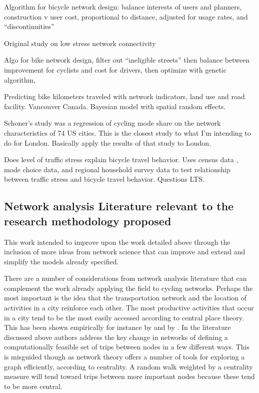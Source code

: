 \documentclass[11pt]{article} %
\begin{document}
Algorithm for bicycle network design: balance interests of users and planners, construction v user cost, proportional to distance, adjusted for usage rates, and ``discontinuities'' 
\cite{mauttone2017bicycle}

Original study on low stress network connectivity
\cite{mekuria2012low}


Algo for bike network design, filter out ``ineligible streets'' then balance between improvement for cyclists and cost for drivers, then optimize with genetic algorithm, 
\cite{mesbah2012bilevel}


Predicting bike kilometers traveled with network indicators, land use and road facility. Vancouver Canada. Bayesian model with spatial random effects. 
\cite{osama2017models}

Schoner's study was a regression of cycling mode share on the network characteristics of 74 US cities. This is the closest study to what I'm intending to do for London. Basically apply the results of that study to London. 
\cite{schoner2014missing}


Does level of traffic stress explain bicycle travel behavior. Uses census data , mode choice data, and regional household survey data to test relationship between traffic stress and bicycle travel behavior. Questions LTS. 
\cite{wang2016does}




\subsection{Network analysis Literature relevant to the research methodology proposed}

This work intended to improve upon the work detailed above through the inclusion of more ideas from network science that can improve and extend and simplify the models already specified. 

There are a number of considerations from network analysis literature that can complement the work already applying the field to cycling networks. Perhaps the most important is the idea that the transportation network and the location of activities in a city reinforce each other. The most productive activities that occur in a city tend to be the most easily accessed according to central place theory. This has been shown empirically for instance by \cite{porta2012street} and by \cite{wang2011street}. In the literature discussed above authors address the key change in networks of defining a computationally feasible set of trips between nodes in a few different ways. This is misguided though as network theory offers a number of tools for exploring a graph efficiently, according to centrality. A random walk weighted by a centrality measure will tend toward trips between more important nodes because these tend to be more central. 
\end{document}
